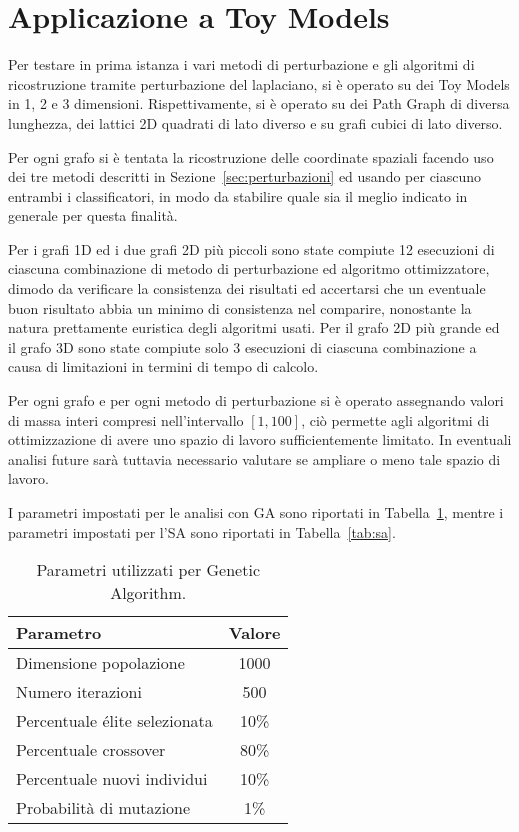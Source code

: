 \documentclass[10pt,a4paper]{article}
\begin{document}
\section{Applicazione a Toy Models}\label{sec:applicazione}

Per testare in prima istanza i vari metodi di perturbazione e gli algoritmi di ricostruzione tramite perturbazione del laplaciano, si è operato su dei Toy Models in 1, 2 e 3 dimensioni.
Rispettivamente, si è operato su dei Path Graph di diversa lunghezza, dei lattici 2D quadrati di lato diverso e su grafi cubici di lato diverso.

Per ogni grafo si è tentata la ricostruzione delle coordinate spaziali facendo uso dei tre metodi descritti in Sezione~\ref{sec:perturbazioni} ed usando per ciascuno entrambi i classificatori, in modo da stabilire quale sia il meglio indicato in generale per questa finalità.

Per i grafi 1D ed i due grafi 2D più piccoli sono state compiute 12 esecuzioni di ciascuna combinazione di metodo di perturbazione ed algoritmo ottimizzatore, dimodo da verificare la consistenza dei risultati ed accertarsi che un eventuale buon risultato abbia un minimo di consistenza nel comparire, nonostante la natura prettamente euristica degli algoritmi usati. Per il grafo 2D più grande ed il grafo 3D sono state compiute solo 3 esecuzioni di ciascuna combinazione a causa di limitazioni in termini di tempo di calcolo.

Per ogni grafo e per ogni metodo di perturbazione si è operato assegnando valori di massa interi compresi nell'intervallo \([1, 100]\), ciò permette agli algoritmi di ottimizzazione di avere uno spazio di lavoro sufficientemente limitato. In eventuali analisi future sarà tuttavia necessario valutare se ampliare o meno tale spazio di lavoro.

I parametri impostati per le analisi con GA sono riportati in Tabella~\ref{tab:ga}, mentre i parametri impostati per l'SA sono riportati in Tabella~\ref{tab:sa}.

\begin{table}[!htp]
    \centering
    \begin{tabular}{lc}
        \toprule
        Parametro & Valore \\
        \midrule
        Dimensione popolazione & 1000 \\
        Numero iterazioni & 500 \\
        Percentuale élite selezionata & 10\% \\
        Percentuale crossover & 80\% \\
        Percentuale nuovi individui & 10\% \\
        Probabilità di mutazione & 1\% \\ 
        \bottomrule
    \end{tabular}
    \caption{Parametri utilizzati per Genetic Algorithm.}\label{tab:ga}
\end{table}
\end{document}
